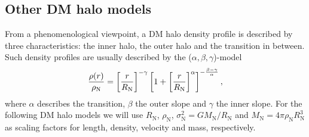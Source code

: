 \subsection{Other DM halo models}
\label{sec:model:dc14-nfw}

From a phenomenological viewpoint, a DM halo density profile is described by three characteristics: the inner halo, the outer halo and the transition in between. Such density profiles are usually described by the ($\alpha, \beta, \gamma$)-model \citep{1990ApJ...356..359H} 
%
\begin{equation}
    \label{eqn:hernquist}
	\frac{\rho(r)}{\rho_\mathrm{N}} = \qbracket{\frac{r}{R_\mathrm{N}}}^{-\gamma}\qbracket{1 + \qbracket{\frac{r}{R_\mathrm{N}}}^\alpha}^{-\frac{\beta - \gamma}{\alpha}},
\end{equation} 
%
where $\alpha$ describes the transition, $\beta$ the outer slope and $\gamma$ the inner slope.  For the following DM halo models we will use $R_\mathrm{N}$, $\rho_\mathrm{N}$, $\sigma_\mathrm{N}^2 = G M_\mathrm{N}/R_\mathrm{N}$ and $M_\mathrm{N} = 4\pi \rho_\mathrm{N} R_\mathrm{N}^3$ as scaling factors for length, density, velocity and mass, respectively.


